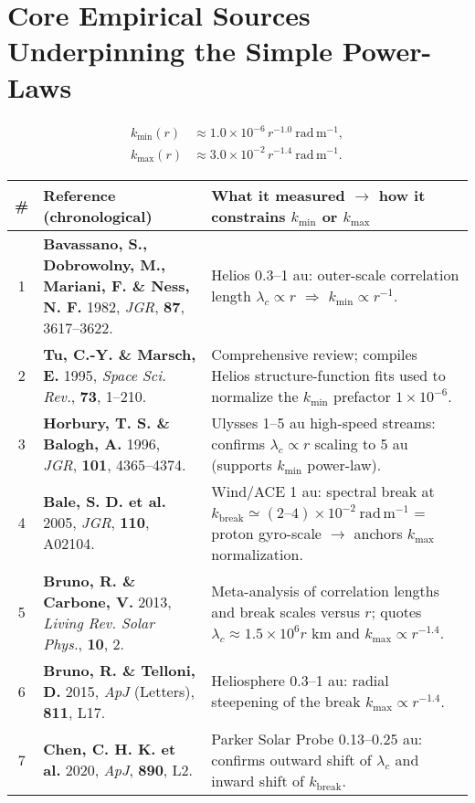 \section*{Core Empirical Sources Underpinning the Simple Power-Laws}

\begin{align*}
k_{\min}(r) &\approx 1.0 \times 10^{-6}\, r^{-1.0}\ \mathrm{rad\,m^{-1}}, \\
k_{\max}(r) &\approx 3.0 \times 10^{-2}\, r^{-1.4}\ \mathrm{rad\,m^{-1}}.
\end{align*}

\begin{table}[h!]
\centering
\begin{tabular}{|c|p{7cm}|p{8cm}|}
\hline
\# & \textbf{Reference (chronological)} & \textbf{What it measured $\rightarrow$ how it constrains $k_{\min}$ or $k_{\max}$} \\
\hline
1 & \textbf{Bavassano, S., Dobrowolny, M., Mariani, F. \& Ness, N. F.} 1982, \textit{JGR}, \textbf{87}, 3617--3622. & Helios 0.3--1 au: outer-scale correlation length $\lambda_c \propto r$ $\Rightarrow$ $k_{\min} \propto r^{-1}$. \\
\hline
2 & \textbf{Tu, C.-Y. \& Marsch, E.} 1995, \textit{Space Sci. Rev.}, \textbf{73}, 1--210. & Comprehensive review; compiles Helios structure-function fits used to normalize the $k_{\min}$ prefactor $1 \times 10^{-6}$. \\
\hline
3 & \textbf{Horbury, T. S. \& Balogh, A.} 1996, \textit{JGR}, \textbf{101}, 4365--4374. & Ulysses 1--5 au high-speed streams: confirms $\lambda_c \propto r$ scaling to 5 au (supports $k_{\min}$ power-law). \\
\hline
4 & \textbf{Bale, S. D. et al.} 2005, \textit{JGR}, \textbf{110}, A02104. & Wind/ACE 1 au: spectral break at $k_{\text{break}} \simeq (2\text{--}4) \times 10^{-2}\ \mathrm{rad\,m^{-1}}$ = proton gyro-scale $\rightarrow$ anchors $k_{\max}$ normalization. \\
\hline
5 & \textbf{Bruno, R. \& Carbone, V.} 2013, \textit{Living Rev. Solar Phys.}, \textbf{10}, 2. & Meta-analysis of correlation lengths and break scales versus $r$; quotes $\lambda_c \approx 1.5 \times 10^6 r$ km and $k_{\max} \propto r^{-1.4}$. \\
\hline
6 & \textbf{Bruno, R. \& Telloni, D.} 2015, \textit{ApJ} (Letters), \textbf{811}, L17. & Heliosphere 0.3--1 au: radial steepening of the break $k_{\max} \propto r^{-1.4}$. \\
\hline
7 & \textbf{Chen, C. H. K. et al.} 2020, \textit{ApJ}, \textbf{890}, L2. & Parker Solar Probe 0.13--0.25 au: confirms outward shift of $\lambda_c$ and inward shift of $k_{\text{break}}$. \\

\end{tabular}
\end{table}
